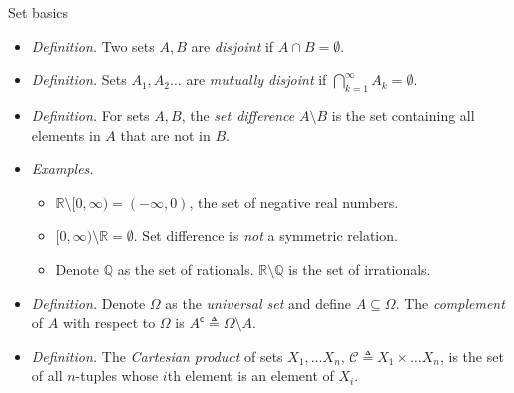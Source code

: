 \documentclass{beamer}
\numberwithin{equation}{section}
\begin{document}
\begin{frame}{Set basics}
    \begin{itemize}
        \item
        \textit{Definition.} Two sets $ A, B $ are \textit{disjoint} if
        $ A \cap B = \emptyset $.

        \item
        \textit{Definition.} Sets $ A_1, A_2 \ldots $ are
        \textit{mutually disjoint} if $ \bigcap_{k = 1}^\infty A_k =
        \emptyset $.

        \item
        \textit{Definition.} For sets $ A, B $, the \textit{set difference}
        $ A \setminus B $ is the set containing all elements in $ A $ that are
        not in $ B $.

        \item
        \textit{Examples.}
        \begin{itemize}
            \item
            $ \mathbb{R} \setminus [0, \infty) = (-\infty, 0) $, the set of
            negative real numbers. 

            \item
            $ [0, \infty) \setminus \mathbb{R} = \emptyset $. Set difference
            is \textit{not} a symmetric relation.

            \item
            Denote $ \mathbb{Q} $ as the set of rationals.
            $ \mathbb{R} \setminus \mathbb{Q} $ is the set of irrationals.
        \end{itemize}

        \item
        \textit{Definition.} Denote $ \Omega $ as the \textit{universal set}
        and define $ A \subseteq \Omega $. The \textit{complement} of $ A $
        with respect to $ \Omega $ is $ A^\mathsf{c} \triangleq \Omega
        \setminus A $.

        \item
        \textit{Definition.} The \textit{Cartesian product} of sets
        $ X_1, \ldots X_n $, $ \mathcal{C} \triangleq
        X_1 \times \ldots X_n $, is the set of all $ n $-tuples whose
        $ i $th element is an element of $ X_i $.
    \end{itemize}
\end{frame}
\end{document}
